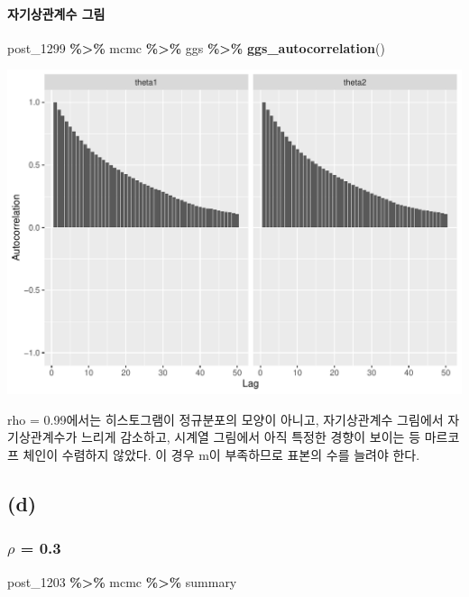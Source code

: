 \documentclass[
]{article}
\newenvironment{Shaded}{\begin{snugshade}}{\end{snugshade}}
\newcommand{\FunctionTok}[1]{\textcolor[rgb]{0.13,0.29,0.53}{\textbf{#1}}}
\newcommand{\NormalTok}[1]{#1}
\newcommand{\SpecialCharTok}[1]{\textcolor[rgb]{0.81,0.36,0.00}{\textbf{#1}}}
\begin{document}
\paragraph{자기상관계수
그림}\label{uxc790uxae30uxc0c1uxad00uxacc4uxc218-uxadf8uxb9bc-1}

\begin{Shaded}
\begin{Highlighting}[]
\NormalTok{post\_1299 }\SpecialCharTok{\%\textgreater{}\%}\NormalTok{ mcmc }\SpecialCharTok{\%\textgreater{}\%}\NormalTok{ ggs }\SpecialCharTok{\%\textgreater{}\%} \FunctionTok{ggs\_autocorrelation}\NormalTok{()}
\end{Highlighting}
\end{Shaded}

\begin{center}\includegraphics[width=0.8\linewidth]{Bayes_stat_hw3_files/figure-latex/unnamed-chunk-11-1} \end{center}

rho = 0.99에서는 히스토그램이 정규분포의 모양이 아니고, 자기상관계수
그림에서 자기상관계수가 느리게 감소하고, 시계열 그림에서 아직 특정한
경향이 보이는 등 마르코프 체인이 수렴하지 않았다. 이 경우 m이 부족하므로
표본의 수를 늘려야 한다.

\subsection{(d)}\label{d}

\subsubsection{\texorpdfstring{\(\rho\) =
0.3}{\textbackslash rho = 0.3}}\label{rho-0.3}

\begin{Shaded}
\begin{Highlighting}[]
\NormalTok{post\_1203 }\SpecialCharTok{\%\textgreater{}\%}\NormalTok{ mcmc }\SpecialCharTok{\%\textgreater{}\%}\NormalTok{ summary}
\end{Highlighting}
\end{Shaded}
\end{document}
